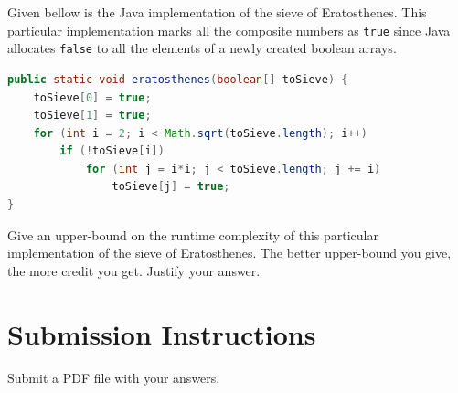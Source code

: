 \documentclass{homework}
\begin{document}
\question Given bellow is the Java implementation of the sieve of
Eratosthenes. This particular implementation marks all the composite
numbers as \texttt{true} since Java allocates \texttt{false} to all
the elements of a newly created boolean arrays.
\begin{lstlisting}[language=java]
public static void eratosthenes(boolean[] toSieve) {
    toSieve[0] = true;
    toSieve[1] = true;
    for (int i = 2; i < Math.sqrt(toSieve.length); i++)
        if (!toSieve[i])
            for (int j = i*i; j < toSieve.length; j += i)
                toSieve[j] = true;
}
\end{lstlisting}
Give an upper-bound on the runtime complexity of this particular
implementation of the sieve of Eratosthenes. The better upper-bound
you give, the more credit you get. Justify your answer.
\section*{Submission Instructions}
Submit a PDF file with your answers.
\end{document}
